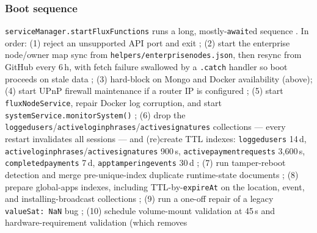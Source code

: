 \subsubsection{Boot sequence}
\texttt{serviceManager.\allowbreak{}startFluxFunctions} runs a long, mostly-\texttt{await}ed sequence
. In order: (1) reject an
unsupported API port and exit ; (2)
start the enterprise node/owner map sync from \texttt{helpers/\allowbreak{}enterprisenodes.\allowbreak{}json}, then resync
from GitHub every 6\,h, with fetch failure swallowed by a \texttt{.catch} handler so boot proceeds
on stale data ; (3) hard-block on
Mongo and Docker availability (above); (4) start UPnP firewall maintenance if a router IP is
configured ; (5) start
\texttt{flux\allowbreak{}Node\allowbreak{}Service}, repair Docker log corruption, and start \texttt{systemService.\allowbreak{}monitorSystem()}
; (6) drop the
\texttt{loggedusers}\slash\texttt{activeloginphrases}\slash\texttt{activesignatures} collections — every
restart invalidates all sessions — and (re)create TTL indexes: \texttt{loggedusers} 14\,d,
\texttt{activeloginphrases}\slash\texttt{activesignatures} 900\,s, \texttt{activepaymentrequests}
3{,}600\,s, \texttt{completedpayments} 7\,d, \texttt{apptamperingevents} 30\,d
; (7) run tamper-reboot detection
and merge pre-unique-index duplicate runtime-state documents
; (8) prepare global-apps indexes,
including TTL-by-\texttt{expireAt} on the location, event, and installing-broadcast collections
; (9) run a one-off repair of a
legacy \texttt{valueSat: NaN} bug ;
(10) schedule volume-mount validation at 45\,s and hardware-requirement validation (which removes
